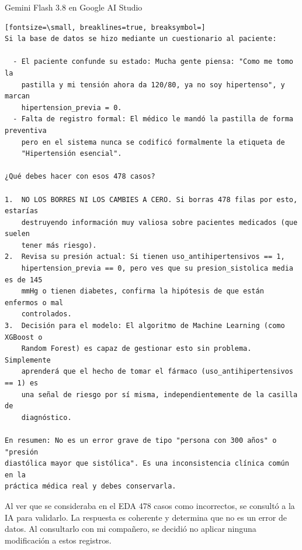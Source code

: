 \documentclass[12pt,a4paper,oneside]{book}
\begin{document}
\begin{iaresp}{Gemini Flash 3.8 en Google AI Studio}
\begin{Verbatim}[fontsize=\small, breaklines=true, breaksymbol=]
Si la base de datos se hizo mediante un cuestionario al paciente:

  - El paciente confunde su estado: Mucha gente piensa: "Como me tomo la
    pastilla y mi tensión ahora da 120/80, ya no soy hipertenso", y marcan
    hipertension_previa = 0.
  - Falta de registro formal: El médico le mandó la pastilla de forma preventiva
    pero en el sistema nunca se codificó formalmente la etiqueta de
    "Hipertensión esencial".

¿Qué debes hacer con esos 478 casos?

1.  NO LOS BORRES NI LOS CAMBIES A CERO. Si borras 478 filas por esto, estarías
    destruyendo información muy valiosa sobre pacientes medicados (que suelen
    tener más riesgo).
2.  Revisa su presión actual: Si tienen uso_antihipertensivos == 1,
    hipertension_previa == 0, pero ves que su presion_sistolica media es de 145
    mmHg o tienen diabetes, confirma la hipótesis de que están enfermos o mal
    controlados.
3.  Decisión para el modelo: El algoritmo de Machine Learning (como XGBoost o
    Random Forest) es capaz de gestionar esto sin problema. Simplemente
    aprenderá que el hecho de tomar el fármaco (uso_antihipertensivos == 1) es
    una señal de riesgo por sí misma, independientemente de la casilla de
    diagnóstico.

En resumen: No es un error grave de tipo "persona con 300 años" o "presión
diastólica mayor que sistólica". Es una inconsistencia clínica común en la
práctica médica real y debes conservarla.
\end{Verbatim}
\end{iaresp}
\begin{iaanalisis}
Al ver que se consideraba en el EDA 478 casos como incorrectos, se consultó a la IA para validarlo. La respuesta es coherente y determina que no es un error de datos. Al consultarlo con mi compañero, se decidió no aplicar ninguna modificación a estos registros.
\end{iaanalisis}
\end{document}
